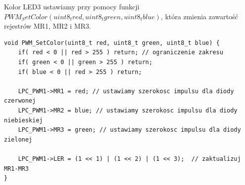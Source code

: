 \begin{enumerate}
        Kolor LED3 ustawiamy przy pomocy funkcji $PWM_SetColor(uint8_t red, uint8_t green, uint8_t blue)$, która zmienia zawartość rejestrów MR1, MR2 i MR3.
        
        \begin{lstlisting}
void PWM_SetColor(uint8_t red, uint8_t green, uint8_t blue) {
    if( red < 0 || red > 255 ) return; // ograniczenie zakresu
    if( green < 0 || green > 255 ) return;
    if( blue < 0 || red > 255 ) return;

    LPC_PWM1->MR1 = red; // ustawiamy szerokosc impulsu dla diody czerwonej
    LPC_PWM1->MR2 = blue; // ustawiamy szerokosc impulsu dla diody niebieskiej
    LPC_PWM1->MR3 = green; // ustawiamy szerokosc impulsu dla diody zielonej

    LPC_PWM1->LER = (1 << 1) | (1 << 2) | (1 << 3);  // zaktualizuj MR1-MR3
}
        \end{lstlisting}
\end{enumerate}
